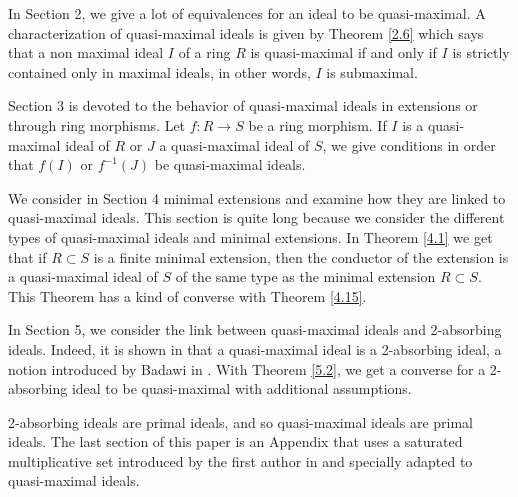 \documentclass[12pt,leqno]{amsart}
\theoremstyle{definition}
\begin{document}
In Section 2, we give a lot of equivalences for an ideal to be quasi-maximal. A characterization of quasi-maximal ideals is given by Theorem \ref{2.6} which says that a non maximal ideal $I$ of a ring $R$ is quasi-maximal if and only if $I$ is strictly contained only in maximal ideals, 
 in other words, $I$ is submaximal.

Section 3 is devoted to the behavior of quasi-maximal ideals in extensions or through ring morphisms. Let $f:R\to S$ be a ring morphism. If $I$ is a quasi-maximal ideal of $R$ or $J$ a quasi-maximal ideal of $S$, we give conditions in order that $f(I)$ or $f^{-1}(J)$ be quasi-maximal ideals.

We consider in Section 4 minimal extensions and examine how they are linked to quasi-maximal ideals. This section is quite long because we consider the different types of quasi-maximal ideals and minimal extensions. In Theorem \ref{4.1} we get that if $R\subset S$ is a finite minimal extension, then the conductor of the extension is a quasi-maximal ideal of $S$ of the same type as the minimal extension $R\subset S$. This Theorem has a kind of converse with Theorem \ref{4.15}. 
 
In Section 5, we consider the link between quasi-maximal ideals and 2-absorbing ideals. Indeed, it is shown in \cite[Theorem 1]{AKKT} that a quasi-maximal ideal is a 2-absorbing ideal, a notion introduced by Badawi in \cite{Ba}. With Theorem \ref{5.2}, we get a converse for a  
 2-absorbing ideal to be quasi-maximal with additional assumptions.
  
2-absorbing ideals are primal ideals, and so quasi-maximal ideals are primal ideals. The last section of this paper is an Appendix that uses a saturated multiplicative set introduced by the first author in \cite{PICANAL} and  specially adapted to quasi-maximal ideals.
\end{document}
